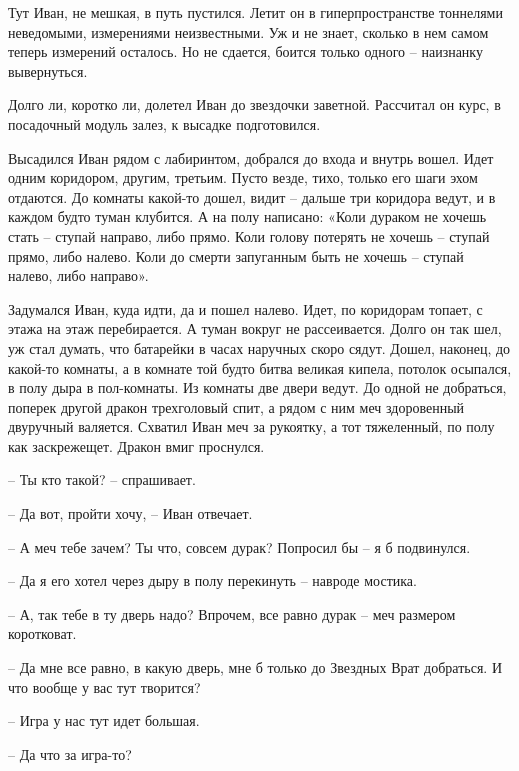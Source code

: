 \documentclass[ebook,oneside,final,openright]{memoir}
\begin{document}
\par
Тут Иван, не мешкая, в путь пустился. Летит он в гиперпространстве тоннелями неведомыми, измерениями неизвестными. Уж и не знает, сколько в нем самом теперь измерений осталось. Но не сдается, боится только одного – наизнанку вывернуться.\par
\par
Долго ли, коротко ли, долетел Иван до звездочки заветной. Рассчитал он курс, в посадочный модуль залез, к высадке подготовился.\par
\par
Высадился Иван рядом с лабиринтом, добрался до входа и внутрь вошел. Идет одним коридором, другим, третьим. Пусто везде, тихо, только его шаги эхом отдаются. До комнаты какой-то дошел, видит – дальше три коридора ведут, и в каждом будто туман клубится. А на полу написано: «Коли дураком не хочешь стать – ступай направо, либо прямо. Коли голову потерять не хочешь – ступай прямо, либо налево. Коли до смерти запуганным быть не хочешь – ступай налево, либо направо».\par
\par
Задумался Иван, куда идти, да и пошел налево. Идет, по коридорам топает, с этажа на этаж перебирается. А туман вокруг не рассеивается. Долго он так шел, уж стал думать, что батарейки в часах наручных скоро сядут. Дошел, наконец, до какой-то комнаты, а в комнате той будто битва великая кипела, потолок осыпался, в полу дыра в пол-комнаты. Из комнаты две двери ведут. До одной не добраться, поперек другой дракон трехголовый спит, а рядом с ним меч здоровенный двуручный валяется. Схватил Иван меч за рукоятку, а тот тяжеленный, по полу как заскрежещет. Дракон вмиг проснулся.\par
\par
– Ты кто такой? – спрашивает.\par
– Да вот, пройти хочу, – Иван отвечает.\par
– А меч тебе зачем? Ты что, совсем дурак? Попросил бы – я б подвинулся.\par
– Да я его хотел через дыру в полу перекинуть – навроде мостика.\par
– А, так тебе в ту дверь надо? Впрочем, все равно дурак – меч размером коротковат.\par
– Да мне все равно, в какую дверь, мне б только до Звездных Врат добраться. И что вообще у вас тут творится?\par
– Игра у нас тут идет большая.\par
– Да что за игра-то?\par
\end{document}
